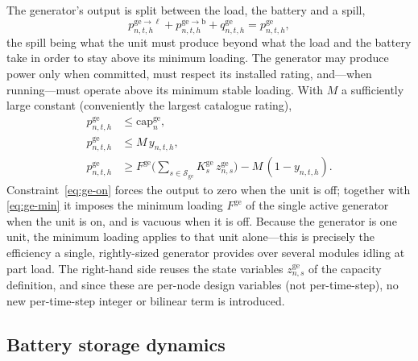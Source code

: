 \documentclass[11pt,a4paper]{article}
\theoremstyle{plain}
\theoremstyle{definition}
\begin{document}
The generator's output is split between the load, the battery and a spill,
\begin{equation}
  p^{\mathrm{ge}\to\ell}_{n,t,h}+p^{\mathrm{ge}\to\mathrm{b}}_{n,t,h}+q^{\mathrm{ge}}_{n,t,h}
  = p^{\mathrm{ge}}_{n,t,h},
  \label{eq:ge-split}
\end{equation}
the spill being what the unit must produce beyond what the load and the battery take in
order to stay above its minimum loading. The generator may produce power only when
committed, must respect its installed rating, and---when running---must operate above its
minimum stable loading. With $M$ a sufficiently large constant (conveniently the largest
catalogue rating),
\begin{align}
  p^{\mathrm{ge}}_{n,t,h} &\leq \mathrm{cap}^{\mathrm{ge}}_n, \label{eq:ge-cap}\\
  p^{\mathrm{ge}}_{n,t,h} &\leq M\, y_{n,t,h}, \label{eq:ge-on}\\
  p^{\mathrm{ge}}_{n,t,h} &\geq F^{\mathrm{ge}}
      \Big(\sum_{s\in\mathcal{S}_{\mathrm{ge}}}K^{\mathrm{ge}}_s\,
      z^{\mathrm{ge}}_{n,s}\Big) - M\,(1-y_{n,t,h}). \label{eq:ge-min}
\end{align}
Constraint~\eqref{eq:ge-on} forces the output to zero when the unit is off; together with
\eqref{eq:ge-min} it imposes the minimum loading $F^{\mathrm{ge}}$ of the single active
generator when the unit is on, and is vacuous when it is off. Because the generator is one
unit, the minimum loading applies to that unit alone---this is precisely the efficiency a
single, rightly-sized generator provides over several modules idling at part load. The
right-hand side reuses the state variables $z^{\mathrm{ge}}_{n,s}$ of the capacity
definition, and since these are per-node design variables (not per-time-step), no new
per-time-step integer or bilinear term is introduced.

\subsection{Battery storage dynamics}
\label{sec:battery}
\end{document}
